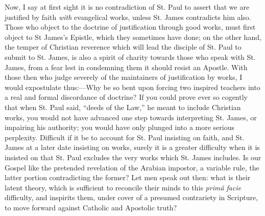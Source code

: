 Now, I say at first sight it is no contradiction of St. Paul to
assert that we are justified by faith \emph{with} evangelical works,
unless St. James contradicts him also. Those who object to the
doctrine of justification through good works, must first object to St
James's Epistle, which they sometimes have done; on the other hand,
the temper of Christian reverence which will lead the disciple of St.
Paul to submit to St. James, is also a spirit of charity towards those
who speak with St. James, from a fear lest in condemning them it
should resist an Apostle. With those then who judge severely of the
maintainers of justification by works, I would expostulate thus:—Why
be so bent upon forcing two inspired teachers into a real and formal
discordance of doctrine? If you could prove ever so cogently that when
St. Paul said, ``deeds of the Law,'' he meant to include
Christian works, you would not have advanced one step towards
interpreting St. James, or impairing his authority; you would have
only plunged into a more serious perplexity. Difficult if it be to
account for St. Paul insisting on faith, and St. James at a later date
insisting on works, surely it is a greater difficulty when it is
insisted on that St. Paul excludes the very works which St. James
includes. Is our Gospel like the pretended revelation of the Arabian
impostor, a variable rule, the latter portion contradicting the
former? Let men speak out then: what is their latent theory, which is
sufficient to reconcile their minds to this \emph{primâ facie}
difficulty, and inspirits them, under cover of a presumed contrariety
in Scripture, to move forward against Catholic and Apostolic truth?

